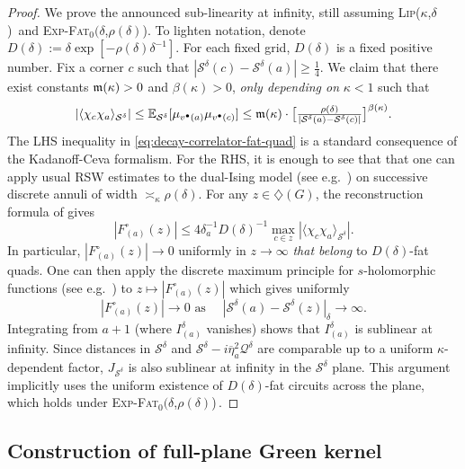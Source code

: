 \documentclass[reqno]{amsart}
\numberwithin{equation}{section}
\theoremstyle{definition}
\theoremstyle{remark}
\newcommand\cS{\mathcal{S}}
\def\LipKd{{\mbox{\textsc{Lip(}$\kappa$\textsc{,}$\delta$\textsc{)}}}}
\def\ExpFat{{{\mbox{\textsc{Exp-Fat}$_0(\delta$\textsc{,}$\rho(\delta)$\textsc{)}}}}}
\begin{document}
\begin{proof}
We prove the announced sub-linearity at infinity, still assuming \LipKd\ and \ExpFat. To lighten notation, denote $D(\delta):=\delta\exp[-\rho(\delta)\delta^{-1}]$. For each fixed grid, $D(\delta)$ is a fixed positive number. Fix a corner $c$ such that $|\cS^{\delta}(c)-\cS^{\delta}(a)| \geq \frac{1}{4}$. 
We claim that there exist constants $\frak{m}(\kappa)>0 $ and $\beta(\kappa)>0$, \emph{only depending on} $\kappa <1 $ such that 
\begin{equation}\label{eq:decay-correlator-fat-quad}
|\langle \chi_c\chi_a \rangle_{\cS^\delta}|
\le \mathbb{E}_{\cS^\delta}[\mu_{v^\bullet(a)}\mu_{v^\bullet(c)}]
\le \frak{m}(\kappa) \cdot \big[\tfrac{\rho(\delta)}{|\cS^{\delta}(a)-\cS^{\delta}(c)|}\big]^{\beta(\kappa)}.
\end{equation}
The LHS inequality in \eqref{eq:decay-correlator-fat-quad} is a standard consequence of the Kadanoff-Ceva formalism.  For the RHS, it is enough to see that that one can apply usual RSW estimates to the dual-Ising model (see e.g.\ \cite[Section 4.3]{Che20}) on successive discrete annuli of width $ \asymp_{\kappa}\rho(\delta)$.
For any $z\in\diamondsuit(G)$, the reconstruction formula of \cite[Cor.~6.18]{CLR1} gives 
\[
|F^\circ_{(a)}(z)| \le 4 \delta_{a}^{-1} D(\delta)^{-1}\max_{c\in z}|\langle \chi_c\chi_a \rangle_{\cS^\delta}|.
\]
In particular, $|F^\circ_{(a)}(z)| \to 0 $ uniformly in $z\to \infty$ \emph{that belong} to $D(\delta)$-fat quads. One can then apply the discrete maximum principle for $s$-holomorphic functions (see e.g.\ \cite[Remark 2.9]{Che20}) to $z\mapsto |F^{\circ}_{(a)}(z)|$ which gives uniformly
\begin{equation*}
	|F^{\circ}_{(a)}(z)|  \longrightarrow 0 \textrm{ as } \quad |\cS^{\delta}(a)-\cS^{\delta}(z)|_{\delta}\to\infty.
\end{equation*}
Integrating from $a+1$ (where $I^{\delta}_{(a)}$ vanishes) shows that $I^{\delta}_{(a)}$ is sublinear at infinity. Since distances in $\cS^\delta$ and $\mathcal{S}^\delta - i\overline{\eta}_a^2\mathcal{Q}^\delta$ are comparable up to a uniform $\kappa$-dependent factor, $J_{\cS^\delta}$ is also sublinear at infinity in the $\cS^\delta$ plane. This argument implicitly uses the uniform existence of $D(\delta)$-fat circuits across the plane, which holds under \ExpFat\,.
\end{proof}
\subsection{Construction of full-plane Green kernel}\label{sec:Full-plane-Kernel}
\end{document}
